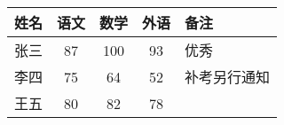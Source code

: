 \documentclass{ctexart}
\begin{document}
	\begin{tabular}{l || c | c | c | p{1.5cm}}%
		\hline%
		姓名 & 语文 & 数学 & 外语 & 备注 \\
		\hline\hline%
		张三 & 87 & 100 & 93 & 优秀 \\
		\hline
		李四 & 75 & 64 & 52 & 补考另行通知 \\
		\hline
		王五 & 80 & 82 & 78 & \\
		\hline
	\end{tabular}
\end{document}
